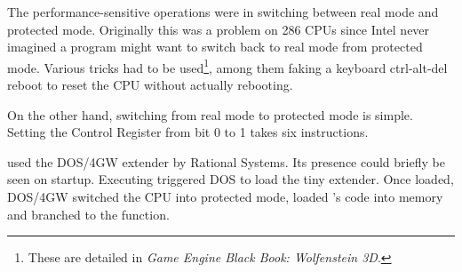 The performance-sensitive operations were in switching between real mode and protected mode. Originally this was a problem on 286 CPUs since Intel never imagined a program might want to switch back to real mode from protected mode. Various tricks had to be used\footnote{These are detailed in \textit{Game Engine Black Book: Wolfenstein 3D}.}, among them faking a keyboard ctrl-alt-del reboot to reset the CPU without actually rebooting.\\
\par
On the other hand, switching from real mode to protected mode is simple. Setting the Control Register from bit 0 to 1 takes six instructions.\\
\par
{}
\par

\doom{} used the DOS/4GW extender by Rational Systems. Its presence could briefly be seen on startup. Executing  triggered DOS to load the tiny extender. Once loaded, DOS/4GW switched the CPU into protected mode, loaded \doom's code into memory and branched to the  function.\\
\par
{}





